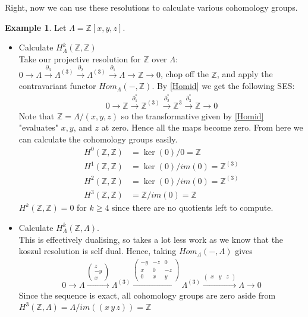 \documentclass[12pt]{book}
\theoremstyle{definition}
\newtheorem{example}[theorem]{Example}
\begin{document}
Right, now we can use these resolutions to calculate various cohomology groups. 
\begin{example}Let $\Lambda = \mathbb{Z}[x,y,z]$.
    \begin{itemize}

    \item Calculate $H^k_\Lambda(\mathbb{Z}, \mathbb{Z})$\\
    Take our projective resolution for $\mathbb{Z}$ over $\Lambda$: $ 0 \rightarrow \Lambda \xrightarrow{\partial_3} \Lambda^{(3)} \xrightarrow{\partial_2} \Lambda^{(3)} \xrightarrow{\partial_1} \Lambda \rightarrow \mathbb{Z} \rightarrow 0$, chop off the $\mathbb{Z}$, and apply the contravariant functor $Hom_\Lambda(-, \mathbb{Z})$. By \ref{Homid} we get the following SES: 
    \begin{align*}
        0 \rightarrow \mathbb{Z} \xrightarrow{\partial^*_1} \mathbb{Z}^{(3)} \xrightarrow{\partial^*_2} \mathbb{Z}^{3} \xrightarrow{\partial^*_3} \mathbb{Z} \rightarrow 0
    \end{align*}
    Note that $\mathbb{Z} = \Lambda/(x,y,z)$ so the transformative given by \ref{Homid} "evaluates" $x, y$, and $z$ at zero. Hence all the maps become zero. From here we can calculate the cohomology groups easily. 
    \begin{align*}
        H^0(\mathbb{Z}, \mathbb{Z}) &= \ker(0)/0 = \mathbb{Z}\\
        H^1(\mathbb{Z}, \mathbb{Z}) &= \ker(0)/im(0) = \mathbb{Z}^{(3)}\\
        H^2(\mathbb{Z}, \mathbb{Z}) &= \ker(0)/im(0) = \mathbb{Z}^{(3)}\\
        H^3(\mathbb{Z}, \mathbb{Z}) &= \mathbb{Z}/im(0) = \mathbb{Z}
    \end{align*}
    $H^k(\mathbb{Z}, \mathbb{Z}) = 0$ for $k \geq 4$ since there are no quotients left to compute.
    \item Calculate $H^k_\Lambda(\mathbb{Z}, \Lambda)$.\\
    This is effectively dualising, so takes a lot less work as we know that the koszul resolution is self dual. Hence, taking $Hom_\Lambda( - , \Lambda)$ gives 
    \begin{align*}
        0 \rightarrow \Lambda \xrightarrow{\left(\begin{smallmatrix} z \\ -y \\ x \end{smallmatrix}\right)} \Lambda^{(3)} \xrightarrow{\left(\begin{smallmatrix}
        -y & -z & 0 \\ x  & 0  & -z \\ 0  & x  & y \end{smallmatrix}\right)} \Lambda^{(3)} \xrightarrow{\left(\begin{smallmatrix} x & y & z \end{smallmatrix} \right)} \Lambda \rightarrow 0
    \end{align*}
    Since the sequence is exact, all cohomology groups are zero aside from $H^3(\mathbb{Z}, \Lambda) = \Lambda/im((x \,  y \,  z)) = \mathbb{Z}$
    \end{itemize}
\end{example}
\end{document}
